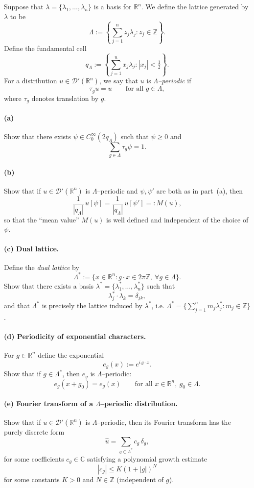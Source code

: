 \documentclass[12pt,a4paper]{article}
\theoremstyle{plain}
\theoremstyle{definition}
\theoremstyle{remark}
\theoremstyle{remark}
\begin{document}
	Suppose that $\lambda = \{\lambda_1,\dots,\lambda_n\}$ is a basis for
	$\mathbb{R}^n$.  We define the lattice generated by $\lambda$ to be
	\[
	\Lambda
	:= \left\{\sum_{j=1}^n z_j \lambda_j : z_j\in\mathbb{Z}\right\}.
	\]
	Define the fundamental cell
	\[
	q_\Lambda
	:= \left\{\sum_{j=1}^n x_j \lambda_j : |x_j|<\tfrac12\right\}.
	\]
	For a distribution $u\in\mathcal{D}'(\mathbb{R}^n)$, we say that $u$ is
	\emph{$\Lambda$–periodic} if
	\[
	\tau_g u = u
	\qquad \text{for all } g\in\Lambda,
	\]
	where $\tau_g$ denotes translation by $g$.
	
	\paragraph{(a)}
	Show that there exists $\psi\in C_0^\infty(2q_\Lambda)$ such that
	$\psi\ge 0$ and
	\[
	\sum_{g\in\Lambda} \tau_g\psi = 1.
	\]
	
	\paragraph{(b)}
	Show that if $u\in\mathcal{D}'(\mathbb{R}^n)$ is $\Lambda$–periodic and
	$\psi,\psi'$ are both as in part~(a), then
	\[
	\frac{1}{|q_\Lambda|}\,u[\psi]
	= \frac{1}{|q_\Lambda|}\,u[\psi']
	=: M(u),
	\]
	so that the ``mean value'' $M(u)$ is well defined and independent of the
	choice of $\psi$.
	
	\paragraph{(c) Dual lattice.}
	Define the \emph{dual lattice} by
	\[
	\Lambda^*
	:= \{x\in\mathbb{R}^n : g\cdot x\in 2\pi\mathbb{Z},\ \forall g\in\Lambda\}.
	\]
	Show that there exists a basis $\lambda^*=\{\lambda_1^*,\dots,\lambda_n^*\}$
	such that
	\[
	\lambda_j^*\cdot\lambda_k = \delta_{jk},
	\]
	and that $\Lambda^*$ is precisely the lattice induced by $\lambda^*$,
	i.e. $\Lambda^* = \{\sum_{j=1}^n m_j \lambda_j^* : m_j\in\mathbb{Z}\}$.
	
	\paragraph{(d) Periodicity of exponential characters.}
	For $g\in\mathbb{R}^n$ define the exponential
	\[
	e_g(x) := e^{i\,g\cdot x}.
	\]
	Show that if $g\in\Lambda^*$, then $e_g$ is $\Lambda$–periodic:
	\[
	e_g(x+g_0) = e_g(x)
	\qquad\text{for all } x\in\mathbb{R}^n,\ g_0\in\Lambda.
	\]
	
	\paragraph{(e) Fourier transform of a $\Lambda$–periodic distribution.}
	Show that if $u\in\mathcal{D}'(\mathbb{R}^n)$ is $\Lambda$–periodic,
	then its Fourier transform has the purely discrete form
	\[
	\widehat{u}
	= \sum_{g\in\Lambda^*} c_g\,\delta_g,
	\]
	for some coefficients $c_g\in\mathbb{C}$ satisfying a polynomial growth
	estimate
	\[
	|c_g| \le K(1+|g|)^N
	\]
	for some constants $K>0$ and $N\in\mathbb{Z}$ (independent of $g$).
	
\end{document}

